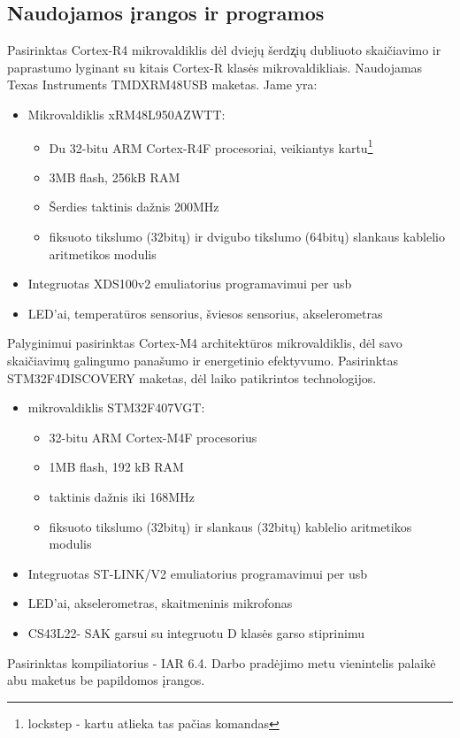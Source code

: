 \documentclass[a4paper, 12pt]{article} %
\begin{document}
\begin{onehalfspacing}
\section{Naudojamos \k{i}rangos ir programos}
Pasirinktas Cortex-R4 mikrovaldiklis d\.{e}l dviej\k{u} \v{s}erd\k{z}i\k{u} dubliuoto skai\v{c}iavimo ir paprastumo lyginant su kitais Cortex-R klas\.{e}s mikrovaldikliais. Naudojamas Texas Instruments TMDXRM48USB maketas. Jame yra:
\begin{itemize}
\item Mikrovaldiklis xRM48L950AZWTT:
\begin{itemize}
\item Du 32-bitu ARM Cortex-R4F procesoriai, veikiantys kartu\footnote{lockstep - kartu atlieka tas pa\v{c}ias komandas}
\item 3MB flash, 256kB RAM
\item \v{S}erdies taktinis da\v{z}nis 200MHz
\item fiksuoto tikslumo (32bit\k{u}) ir dvigubo tikslumo (64bit\k{u}) slankaus kablelio aritmetikos modulis
\end{itemize} 
\item Integruotas XDS100v2 emuliatorius programavimui per usb
\item LED'ai, temperat\=uros sensorius, \v{s}viesos sensorius, akselerometras
\end{itemize}
Palyginimui pasirinktas Cortex-M4 architekt\={u}ros mikrovaldiklis, d\.{e}l savo skai\v{c}iavim\k{u} galingumo pana\v{s}umo ir energetinio efektyvumo. Pasirinktas STM32F4DISCOVERY maketas, d\.{e}l laiko patikrintos technologijos.  
\begin{itemize}
\item mikrovaldiklis STM32F407VGT:
\begin{itemize}
\item 32-bitu ARM Cortex-M4F procesorius
\item 1MB flash, 192 kB RAM 
\item taktinis da\v{z}nis iki 168MHz 
\item fiksuoto tikslumo (32bit\k{u}) ir slankaus (32bit\k{u}) kablelio aritmetikos modulis
\end{itemize}
\item Integruotas ST-LINK/V2 emuliatorius programavimui per usb
\item LED'ai, akselerometras, skaitmeninis mikrofonas
\item CS43L22- SAK garsui su integruotu D klas\.es garso stiprinimu
\end{itemize}
Pasirinktas kompiliatorius - IAR 6.4. Darbo prad\.ejimo metu vienintelis palaik\.e abu maketus be papildomos \k{i}rangos. 

\end{onehalfspacing}
\end{document}
